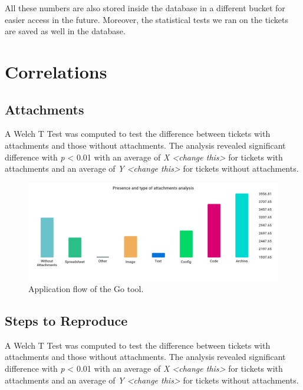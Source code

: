 \documentclass{mpaper}
\begin{document}
All these numbers are also stored inside the database in a different bucket for easier access in the future. Moreover, the statistical 
tests we ran on the tickets are saved as well in the database.

\section{Correlations}\label{correlations}

\subsection{Attachments}

A Welch T Test was computed to test the difference between tickets with attachments and those 
without attachments. The analysis revealed significant difference with \emph{p} < 0.01 with an
average of \emph{X <change this>} for tickets with attachments and an average of \emph{Y <change this>}
for tickets without attachments.

\begin{figure}
  \begin{center}
  \includegraphics[scale=0.25]{images/attachments.png}
  \end{center}
  \caption{\label{attachments}Application flow of the Go tool.}
  \end{figure}

\subsection{Steps to Reproduce}

A Welch T Test was computed to test the difference between tickets with attachments and those 
without attachments. The analysis revealed significant difference with \emph{p} < 0.01 with an
average of \emph{X <change this>} for tickets with attachments and an average of \emph{Y <change this>}
for tickets without attachments.
\end{document}
